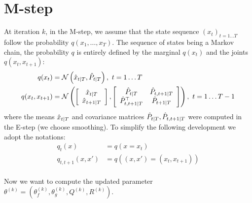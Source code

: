 \section{M-step}

At iteration $k$, in the M-step, we assume that the state sequence $(x_t)_{t=1 \ldots T}$ follow the probability $q \left(x_1, \ldots ,x_T \right)$. The sequence of states being a Markov chain, the probability $q$ is entirely defined by the marginal $q(x_t)$ and the joints $q(x_t,x_{t+1})$:
\begin{align*}
  q(x_t) &= \mathcal{N}\left( \hat{x}_{t \mathbin{\vert} T}, \hat{P}_{t \mathbin{\vert} T} \right), \  t=1 \ldots T\\
  q(x_t, x_{t+1}) &=
  \mathcal{N}
    \left(
      \left[
        \begin{array}{c} \hat{x}_{t \mathbin{\vert} T} \\ \hat{x}_{t+1 \mathbin{\vert} T} \end{array}
      \right],
      \left[
        \begin{array}{cc} \hat{P}_{t \mathbin{\vert} T} & \hat{P}_{t,t+1 \mathbin{\vert} T}\\ \hat{P}_{t,t+1 \mathbin{\vert} T}^{\top} & \hat{P}_{t+1 \mathbin{\vert} T} \end{array}
      \right]
    \right), \  t=1 \ldots T-1\\
\end{align*}
where the means $\hat{x}_{t \mathbin{\vert} T}$ and covariance matrices $\hat{P}_{t \mathbin{\vert} T}, \hat{P}_{t,t+1 \mathbin{\vert} T}$ were computed in the E-step (we choose smoothing).
To simplify the following development we adopt the notations:
\begin{align*}
  q_t(x) &= q(x = x_t)\\
  q_{t,t+1}(x,x') &= q \left((x,x') = (x_t, x_{t+1})\right)\\
\end{align*}

Now we want to compute the updated parameter $\theta^{(k)} = \left( \theta_f^{(k)}, \theta_g^{(k)}, Q^{(k)}, R^{(k)} \right)$.


